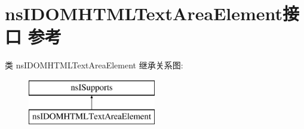 \hypertarget{interfacens_i_d_o_m_h_t_m_l_text_area_element}{}\section{ns\+I\+D\+O\+M\+H\+T\+M\+L\+Text\+Area\+Element接口 参考}
\label{interfacens_i_d_o_m_h_t_m_l_text_area_element}
类 ns\+I\+D\+O\+M\+H\+T\+M\+L\+Text\+Area\+Element 继承关系图\+:\begin{figure}[H]
\begin{center}
\leavevmode
\includegraphics[height=2.000000cm]{interfacens_i_d_o_m_h_t_m_l_text_area_element}
\end{center}
\end{figure}

